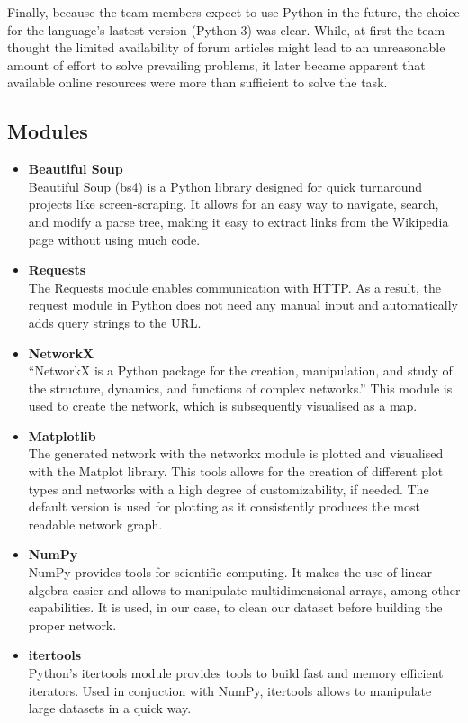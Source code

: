 \documentclass[10pt]{article}
\begin{document}
\noindent Finally, because the team members expect to use Python in the future, the choice for the language's lastest version (Python 3) was clear. While, at first the team thought the limited availability of forum articles might lead to an unreasonable amount of effort to solve prevailing problems, it later became apparent that available online resources were more than sufficient to solve the task. 




\subsection{Modules}

 \begin{itemize}    %
        \item\textbf{Beautiful Soup}\\
	Beautiful Soup (bs4) is a Python library designed for quick turnaround projects like screen-scraping. It allows for an easy way to navigate, search, and modify a parse tree, making 	it easy to extract links from the Wikipedia page without using much code. \cite{cru} 
 
        \item \textbf{Requests}\\
 	The Requests module enables communication with HTTP. As a result, the request module in Python does not need any manual input and automatically adds query strings to the  	
	URL.   \cite{req}
	
        \item \textbf{NetworkX}\\
	``NetworkX is a Python package for the creation, manipulation, and study of the structure, dynamics, and functions of complex networks.'' \cite{net} This module is used to create 
	the network, which is subsequently visualised as a map. 
	
        \item \textbf{Matplotlib}\\
        The generated network with the networkx module is plotted and visualised with the Matplot library. This tools allows for the creation of different plot types and networks with a high 	degree of customizability, if needed. The default version is used for plotting as it consistently produces the most readable network graph. 
        
        \item \textbf{NumPy}\\
	NumPy provides tools for scientific computing. It makes the use of linear algebra easier and allows to manipulate multidimensional arrays, among other capabilities. It is used, in 	our case, to clean our dataset before building the proper network.

        \item \textbf{itertools}\\
	Python's itertools module provides tools to build fast and memory efficient iterators. Used in conjuction with NumPy, itertools allows to manipulate large datasets in a quick way.
        
        
    \end{itemize}
 
\end{document}
